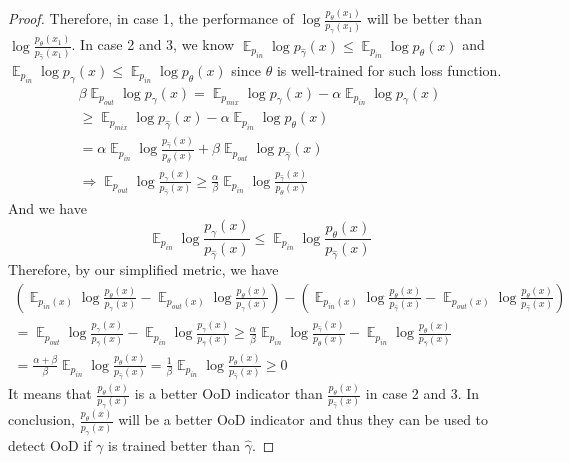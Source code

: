 \documentclass[a3paper]{article}
\newtheorem*{proof}{\it{Proof.}\rm}
\newcommand{\E}{\operatorname{\mathbb{E}}}
\newcommand{\pin}{p_{in}}
\newcommand{\pout}{p_{out}}
\newcommand{\pmix}{p_{mix}}
\begin{document}
\begin{proof}
	Therefore, in case 1, the performance of $\log \frac{p_\theta(x_1)}{p_{\gamma}(x_1)}$ will be better than $\log \frac{p_\theta(x_1)}{p_{\hat\gamma}(x_1)}$. In case 2 and 3, we know $\E_{\pin} \log p_{\hat\gamma}(x) \leq \E_{\pin} \log p_\theta(x)$ and $\E_{\pin} \log p_\gamma(x) \leq \E_{\pin} \log p_\theta(x)$ since $\theta$ is well-trained for such loss function. 
	\begin{align*}
		\beta \E_{\pout} \log p_\gamma(x) = \E_{\pmix} \log p_\gamma(x) - \alpha \E_{\pin} \log p_\gamma(x) \\
		\geq \E_{\pmix} \log p_{\hat\gamma}(x) - \alpha \E_{\pin} \log p_\theta(x) \\
		= \alpha \E_{\pin} \log \frac{p_{\hat \gamma}(x)}{p_\theta(x)} + \beta \E_{\pout} \log p_{\hat \gamma}(x) \\
	\Rightarrow \E_{\pout} \log \frac{p_\gamma(x)}{p_{\hat\gamma}(x)} \geq \frac{\alpha}{\beta} \E_{\pin} \log \frac{p_{\hat \gamma}(x)}{p_\theta(x)}
	\end{align*}
	And we have 
	\begin{equation*}
		\E_{\pin} \log \frac{p_\gamma(x)}{p_{\hat\gamma}(x)} \leq \E_{\pin} \log \frac{p_\theta(x)}{p_{\hat\gamma}(x)}
	\end{equation*}
	Therefore, by our simplified metric, we have
	\begin{align*}
		(\E_{\pin(x)} \log \frac{p_\theta(x)}{p_{{\gamma}}(x)} - \E_{\pout(x)} \log \frac{p_\theta(x)}{p_{{\gamma}}(x)}) - (\E_{\pin(x)} \log \frac{p_\theta(x)}{p_{{\hat\gamma}}(x)} - \E_{\pout(x)} \log \frac{p_\theta(x)}{p_{\hat\gamma}(x)}) \\
		=  \E_{\pout} \log \frac{p_\gamma(x)}{p_{\hat\gamma}(x)} -\E_{\pin} \log \frac{p_{\gamma}(x)}{p_{\hat\gamma}(x)}\geq \frac{\alpha}{\beta} \E_{\pin} \log \frac{p_{\hat \gamma}(x)}{p_\theta(x)} - \E_{\pin} \log \frac{p_\theta(x)}{p_{\hat\gamma}(x)} \\
		= \frac{\alpha + \beta}{\beta} \E_{\pin} \log \frac{p_\theta(x)}{p_{\hat\gamma}(x)} = \frac{1}{\beta} \E_{\pin} \log \frac{p_\theta(x)}{p_{\hat\gamma}(x)} \geq 0
	\end{align*}
	It means that $\frac{p_\theta(x)}{p_{{\gamma}}(x)}$ is a better OoD indicator than $\frac{p_\theta(x)}{p_{{\hat\gamma}}(x)}$ in case 2 and 3. In conclusion,  $\frac{p_\theta(x)}{p_{{\gamma}}(x)}$ will be a better OoD indicator and thus they can be used to detect OoD if $\gamma$ is trained better than $\hat{\gamma}$. 
	
\end{proof}
\end{document}
